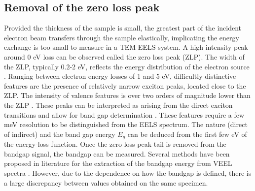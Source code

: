 \documentclass[11pt,a4paper]{article}
\numberwithin{equation}{section}
\numberwithin{figure}{section}
\numberwithin{table}{section}
\begin{document}
\subsection{Removal of the zero loss peak}
Provided the thickness of the sample is small, the greatest part of the incident electron beam transfers through the sample elastically, implicating the energy exchange is too small to measure in a TEM-EELS system. A high intensity peak around 0 eV loss can be observed called the zero loss peak (ZLP). The width of the ZLP, typically 0.2-2 eV, reflects the energy distribution of the electron source \cite{Egerton:2009}. Ranging between electron energy losses of 1 and 5 eV, difficultly distinctive features are the presence of relatively narrow exciton peaks, located close to the ZLP. The intensity of valence features is over two orders of magnitude lower than the ZLP \cite{Abajo:2010}. These peaks can be interpreted as arising from the direct exciton transitions and allow for band gap determination \cite{Stoger:2008}. These features require a few meV resolution to be distinguished from the EELS spectrum. The nature (direct of indirect) and the band gap energy $E_g$ can be deduced from the first few eV of the energy-loss function. Once the zero loss peak tail is removed from the bandgap signal, the bandgap can be measured. Several methods have been proposed in literature for the extraction of the bandgap energy from VEEL spectra \cite{Batson:1986, Lazar:2003, Rafferty:2000, Schamm:2003}. 
However, due to the dependence on how the bandgap is defined, there is a large discrepancy between values obtained on the same specimen.\\
\end{document}
